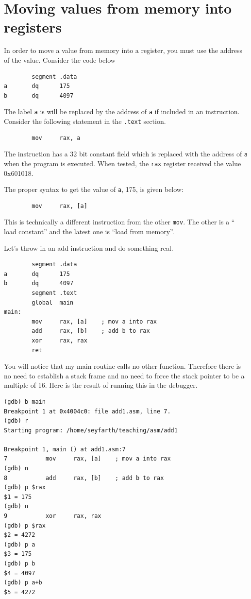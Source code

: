 \documentclass[11pt,b5paper]{book}
\begin{document}
\section{Moving values from memory into registers}

In order to move a value from memory into a register, you must use the address 
of the value.
Consider the code below
\begin{verbatim}
        segment .data
a       dq      175
b       dq      4097
\end{verbatim}

The label {\tt a} is will be replaced by the address of {\tt a} if included
in an instruction.
Consider the following statement in the {\tt .text} section.
\begin{verbatim}
        mov     rax, a
\end{verbatim}
The instruction has a 32 bit constant field which is replaced with the address
of {\tt a} when the program is executed.
When tested, the {\tt rax} register received the value 0x601018.

The proper syntax to get the value of {\tt a}, 175, is given below:
\begin{verbatim}
        mov     rax, [a]
\end{verbatim}
This is technically a different instruction from the other {\tt mov}.
The other is a `` load constant'' and the latest one is ``load from memory''.

Let's throw in an add instruction and do something real. 
\begin{verbatim}
        segment .data
a       dq      175
b       dq      4097
        segment .text
        global  main
main:
        mov     rax, [a]    ; mov a into rax
        add     rax, [b]    ; add b to rax
        xor     rax, rax
        ret
\end{verbatim}

You will notice that my main routine calls no other function.
Therefore there is no need to establish a stack frame and no need to force the
stack pointer to be a multiple of 16.
Here is the result of running this in the debugger. 
\begin{verbatim}
(gdb) b main
Breakpoint 1 at 0x4004c0: file add1.asm, line 7.
(gdb) r
Starting program: /home/seyfarth/teaching/asm/add1 

Breakpoint 1, main () at add1.asm:7
7           mov     rax, [a]    ; mov a into rax
(gdb) n
8           add     rax, [b]    ; add b to rax
(gdb) p $rax
$1 = 175
(gdb) n
9           xor     rax, rax
(gdb) p $rax
$2 = 4272
(gdb) p a
$3 = 175
(gdb) p b
$4 = 4097
(gdb) p a+b
$5 = 4272
\end{verbatim}
\end{document}
